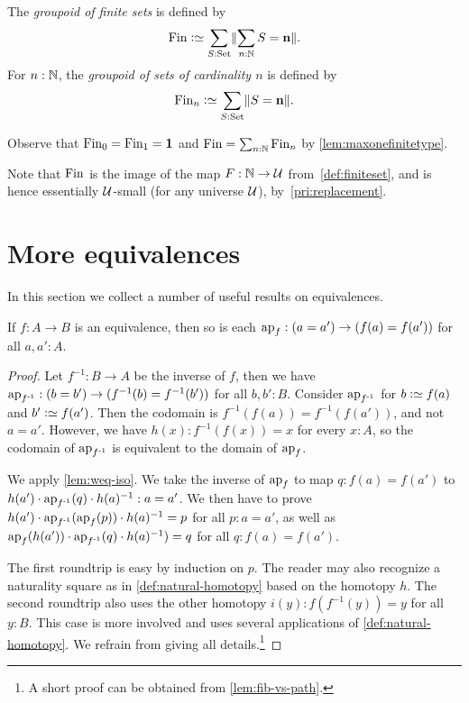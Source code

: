 \begin{definition}
\begin{definition}\label{def:groupoidFin}
The \emph{groupoid of finite sets} is defined by
\[
\fin\defeq\sum_{S:\Set}\Trunc{\sum_{n:\NN}S=\bn{n}}.
\]
For $n:\mathbb{N}$, the \emph{groupoid of sets of cardinality $n$} is defined by
\[
\fin_n\defequi \sum_{S:\Set}\Trunc{S=\bn{n}}.
\]
\end{definition}
Observe that $\fin_0=\fin_1=\bn{1} $ and $\fin=\sum_{n:\NN}\fin_n$
by \cref{lem:maxonefinitetype}.

Note that $\fin$ is the image of the map $F : \mathbb{N} \to {\mathcal{U}}$
from~\cref{def:finiteset}, and is hence essentially ${\mathcal{U}}$-small
(for any universe ${\mathcal{U}}$), by~\cref{pri:replacement}.

\section{More equivalences}
\label{sec:more-on-equivalences}

In this section we collect a number of useful results on equivalences.

\begin{lemma}\label{lem:ap-equivalence}
If $f:A\to B$ is an equivalence, then so is each 
$\ap{f}: (a=a') \to (f(a)=f(a'))$ for all $a,a':A$.
\end{lemma}
\begin{proof}
Let $f^{-1} : B\to A$ be the inverse of $f$, then we have 
$\ap{f^{-1}}: (b=b') \to (f^{-1}(b)=f^{-1}(b'))$ for all $b,b':B$.
Consider $\ap{f^{-1}}$ for $b\defeq f(a)$ and $b'\defeq f(a')$.
Then the codomain is $f^{-1}(f(a))=f^{-1}(f(a'))$, and not $a=a'$.
However, we have $h(x):f^{-1}(f(x))=x$ for every $x:A$, so the 
codomain of $\ap{f^{-1}}$ is equivalent to the domain of $\ap{f}$.

We apply \cref{lem:weq-iso}.
We take the inverse of $\ap{f}$ to map $q: f(a)=f(a')$
to $h(a')\cdot{\ap{f^{-1}}(q)}\cdot {h(a)^{-1}} : a=a'$.
We then have to prove $h(a')\cdot{\ap{f^{-1}}(\ap{f}(p))}\cdot {h(a)^{-1}} = p$
for all $p: a=a'$, as well as 
$\ap{f}(h(a'))\cdot\ap{f^{-1}}(q)\cdot {h(a)^{-1}})=q$ for all $q: f(a)=f(a')$.

The first roundtrip is easy by induction on $p$. The reader may also recognize a 
naturality square as in \cref{def:natural-homotopy} based on the homotopy $h$.
The second roundtrip also uses the other homotopy $i(y):f(f^{-1}(y))=y$ for all $y:B$.
This case is more involved and uses several applications of \cref{def:natural-homotopy}.
We refrain from giving all details.\footnote{%
A short proof can be obtained from \cref{lem:fib-vs-path}.}
\end{proof}


\end{definition}

